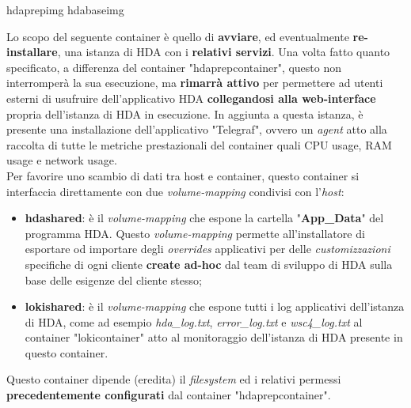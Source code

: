 \begin{namespacedesc}
	 {hdaprepimg}
	 {hdabaseimg}
	 {Lo scopo del seguente container è quello di \textbf{avviare}, ed eventualmente \textbf{re-installare}, una istanza di HDA con i \textbf{relativi servizi}. Una volta fatto quanto specificato, a differenza del container "hdaprepcontainer", questo non interromperà la sua esecuzione, ma \textbf{rimarrà attivo} per permettere ad utenti esterni di usufruire dell'applicativo HDA \textbf{collegandosi alla web-interface} propria dell'istanza di HDA in esecuzione. In aggiunta a questa istanza, è presente una installazione dell'applicativo "Telegraf", ovvero un \textit{agent} atto alla raccolta di tutte le metriche prestazionali del container quali CPU usage, RAM usage e network usage. \\
Per favorire uno scambio di dati tra host e container, questo container si interfaccia direttamente con due \textit{volume-mapping} condivisi con l'\textit{host}:
\begin{itemize}
	\item \textbf{hdashared}: è il \textit{volume-mapping} che espone la cartella "\textbf{App\_Data}" del programma HDA. Questo \textit{volume-mapping} permette all'installatore di esportare od importare degli \textit{overrides} applicativi per delle \textit{customizzazioni} specifiche di ogni cliente \textbf{create ad-hoc} dal team di sviluppo di HDA sulla base delle esigenze del cliente stesso;
	\item \textbf{lokishared}: è il \textit{volume-mapping} che espone tutti i log applicativi dell'istanza di HDA, come ad esempio \textit{hda\_log.txt}, \textit{error\_log.txt} e \textit{wsc4\_log.txt} al container "lokicontainer" atto al monitoraggio dell'istanza di HDA presente in questo container.
\end{itemize}
Questo container dipende (eredita) il \textit{filesystem} ed i relativi permessi \textbf{precedentemente configurati} dal container "hdaprepcontainer".}
\end{namespacedesc}

\newpage

